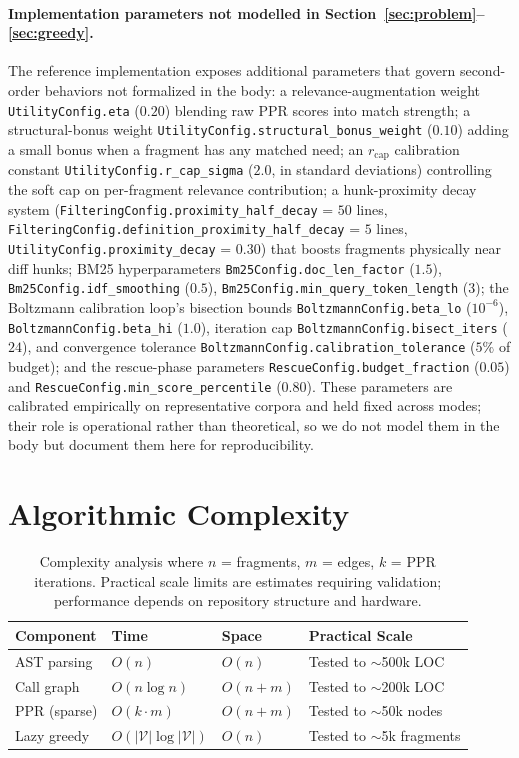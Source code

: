 \documentclass[11pt, a4paper]{article}
\begin{document}
\paragraph{Implementation parameters not modelled in Section~\ref{sec:problem}--\ref{sec:greedy}.} The reference implementation exposes additional parameters that govern second-order behaviors not formalized in the body: a relevance-augmentation weight \texttt{UtilityConfig.eta} ($0.20$) blending raw PPR scores into match strength; a structural-bonus weight \texttt{UtilityConfig.structural\_bonus\_weight} ($0.10$) adding a small bonus when a fragment has any matched need; an $r_{\mathrm{cap}}$ calibration constant \texttt{UtilityConfig.r\_cap\_sigma} ($2.0$, in standard deviations) controlling the soft cap on per-fragment relevance contribution; a hunk-proximity decay system (\texttt{FilteringConfig.proximity\_half\_decay} = $50$ lines, \texttt{FilteringConfig.definition\_proximity\_half\_decay} = $5$ lines, \texttt{UtilityConfig.proximity\_decay} = $0.30$) that boosts fragments physically near diff hunks; BM25 hyperparameters \texttt{Bm25Config.doc\_len\_factor} ($1.5$), \texttt{Bm25Config.idf\_smoothing} ($0.5$), \texttt{Bm25Config.min\_query\_token\_length} ($3$); the Boltzmann calibration loop's bisection bounds \texttt{BoltzmannConfig.beta\_lo} ($10^{-6}$), \texttt{BoltzmannConfig.beta\_hi} ($1.0$), iteration cap \texttt{BoltzmannConfig.bisect\_iters} ($24$), and convergence tolerance \texttt{BoltzmannConfig.calibration\_tolerance} ($5\%$ of budget); and the rescue-phase parameters \texttt{RescueConfig.budget\_fraction} ($0.05$) and \texttt{RescueConfig.min\_score\_percentile} ($0.80$). These parameters are calibrated empirically on representative corpora and held fixed across modes; their role is operational rather than theoretical, so we do not model them in the body but document them here for reproducibility.

\newpage
\section{Algorithmic Complexity}

\begin{table}[h]
\centering
\begin{tabular}{llll}
\toprule
\textbf{Component} & \textbf{Time} & \textbf{Space} & \textbf{Practical Scale} \\
\midrule
AST parsing & $O(n)$ & $O(n)$ & Tested to $\sim$500k LOC \\
Call graph & $O(n \log n)$ & $O(n+m)$ & Tested to $\sim$200k LOC \\
PPR (sparse) & $O(k \cdot m)$ & $O(n+m)$ & Tested to $\sim$50k nodes \\
Lazy greedy & $O(|\mathcal{V}| \log |\mathcal{V}|)$ & $O(n)$ & Tested to $\sim$5k fragments \\
\bottomrule
\end{tabular}
\caption{Complexity analysis where $n$ = fragments, $m$ = edges, $k$ = PPR iterations. Practical scale limits are estimates requiring validation; performance depends on repository structure and hardware.}
\end{table}
\end{document}
